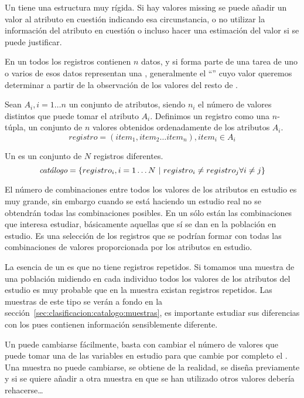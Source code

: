 Un \catalogo tiene una estructura muy rígida. Si hay valores missing se puede añadir un valor al atributo en cuestión indicando esa circunstancia, o no utilizar la información del atributo en cuestión o incluso hacer una estimación del valor si se puede justificar.

En un \catalogo todos los registros contienen $n$ datos, y si forma parte de una tarea de \clasificacion uno o varios de esos datos representan una \clase, generalmente el "`\atributo"' cuyo valor queremos determinar a partir de la observación de los valores del resto de \atributos.

\begin{Definition}[Registro]
   Sean $A_i, i = 1 \ldots n$ un conjunto de atributos, siendo $n_i$ el número de valores distintos que puede tomar el atributo $A_i$. Definimos un registro como una $n$-túpla, un conjunto de $n$ valores obtenidos ordenadamente de los atributos $A_i$.
   $$registro = \left(item_1, item_2\ldots item_n\right), item_i \in A_i$$
\label{def:registro}
\end{Definition}

\begin{Definition}[\Catalogo] Un \catalogo es un conjunto de $N$ registros diferentes.
   $$\catalogo = \left\{registro_i, i = 1\ldots N\ | \ registro_i \neq registro_j \forall i \neq j\right\}$$
\label{def:catalogo}
\end{Definition}


El número de combinaciones entre todos los valores de los atributos en estudio es muy grande, sin embargo cuando se está haciendo un estudio real no se obtendrán todas las combinaciones posibles. En un \catalogo sólo están las combinaciones que interesa estudiar, básicamente aquellas que sí se dan en la población en estudio. Es una selección de los registros que se podrían formar con todas las combinaciones de valores proporcionada por los atributos en estudio.

La esencia de un \catalogo es que no tiene registros repetidos. Si tomamos una muestra de una población midiendo en cada individuo todos los valores de los atributos del estudio es muy probable que en la muestra existan registros repetidos. Las muestras de este tipo se verán a fondo en la sección~\ref{sec:clasificacion:catalogo:muestras}, es importante estudiar sus diferencias con los \catalogos pues contienen información sensiblemente diferente.

Un \catalogo puede cambiarse fácilmente, basta con cambiar el número de valores que puede tomar una de las variables en estudio para que cambie por completo el \catalogo. Una muestra no puede cambiarse, se obtiene de la realidad, se diseña previamente y si se quiere añadir a otra muestra en que se han utilizado otros valores debería rehacerse\ldots


